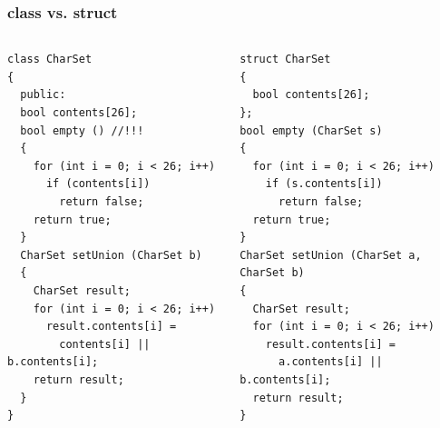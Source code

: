 \documentclass{beamer}
\begin{document}
\begin{frame}[fragile]
\frametitle{class vs. struct}





\begin{columns}[t]
  \begin{column}{0.5\textwidth}
\begin{flushleft}
\begin{lstlisting}
class CharSet
{
  public:
  bool contents[26];
  bool empty () //!!!
  {
    for (int i = 0; i < 26; i++)
      if (contents[i])
        return false;
    return true;
  }
  CharSet setUnion (CharSet b)
  {
    CharSet result;
    for (int i = 0; i < 26; i++)
      result.contents[i] = 
        contents[i] || b.contents[i];
    return result;
  }
}
\end{lstlisting}  
\end{flushleft}
  \end{column}
  \begin{column}{0.5\textwidth}
\begin{flushleft}
\begin{lstlisting}
struct CharSet
{
  bool contents[26];
};
bool empty (CharSet s)
{
  for (int i = 0; i < 26; i++)
    if (s.contents[i])
      return false;
  return true;
}
CharSet setUnion (CharSet a, CharSet b)
{
  CharSet result;
  for (int i = 0; i < 26; i++)
    result.contents[i] = 
      a.contents[i] || b.contents[i];
  return result;
}
\end{lstlisting}  
\end{flushleft}

  \end{column}
\end{columns}


\end{frame}
\end{document}
